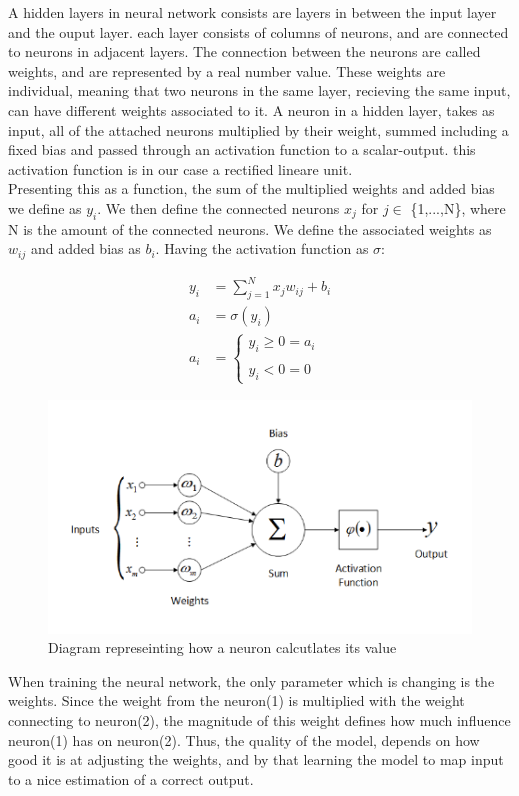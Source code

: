 
A hidden layers in neural network consists are layers in between the input layer and the ouput layer. each layer consists of columns of neurons, and are connected to neurons in adjacent layers. The connection between the neurons are called weights, and are represented by a real number value. These weights are individual, meaning that two neurons in the same layer, recieving the same input, can have different weights associated to it. A neuron in a hidden layer, takes as input, all of the attached neurons multiplied by their weight, summed including a fixed bias and passed through an activation function to a scalar-output. this activation function is in our case a rectified lineare unit.\\

\noindent
Presenting this as a function, the sum of the multiplied weights and added bias we define as $y_i$. We then define the connected neurons $x_j$ for $j \in$ \{1,...,N\}, where N is the amount of the connected neurons. We define the associated weights as $w_{ij}$ and added bias as $b_i$. Having the activation function as $\sigma$:

\begin{align}
	y_i &= \sum^N_{j=1} x_jw_{ij} + b_i\\
	a_i &= \sigma(y_i) \\
	a_i &=\left\{ \begin{matrix}
		y_i \geq 0 = a_i \\
		\\
		y_i < 0 = 0
	\end{matrix}
	\right.
\end{align}


\begin{figure}[!ht]
  \centering
  \includegraphics[scale=1.0]{latex/imgs/neuronFunc.png}
  \caption{Diagram represeinting how a neuron calcutlates its value}\label{Baseline:before}
\end{figure}

\noindent
When training the neural network, the only parameter which is changing is the weights. Since the weight from the neuron(1) is multiplied with the weight connecting to neuron(2), the magnitude of this weight defines how much influence neuron(1) has on neuron(2). Thus, the quality of the model, depends on how good it is at adjusting the weights, and by that learning the model to map input to a nice estimation of a correct output.
